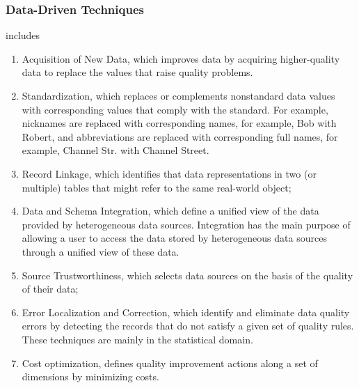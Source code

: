 \documentclass[pdftex,english,oribibl]{llncs}
\begin{document}
\subsubsection{Data-Driven Techniques}
includes
\begin{enumerate}
    \item Acquisition of New Data, which improves data by acquiring higher-quality data to replace the values that raise quality problems.
    \item Standardization, which replaces or complements nonstandard data values with corresponding values that comply with the standard. For example, nicknames are replaced with corresponding names, for example, Bob with Robert, and abbreviations are replaced with corresponding full names, for example, Channel Str. with Channel Street.
    \item Record Linkage, which identifies that data representations in two (or multiple) tables that might refer to the same real-world object;
    \item Data and Schema Integration, which define a unified view of the data provided by heterogeneous data sources. Integration has the main purpose of allowing a user to access the data stored by heterogeneous data sources through a unified view of these data.
    \item Source Trustworthiness, which selects data sources on the basis of the quality of their data;
    \item Error Localization and Correction, which identify and eliminate data quality errors by detecting the records that do not satisfy a given set of quality rules. These techniques are mainly in the statistical domain.
    \item Cost optimization, defines quality improvement actions along a set of dimensions by minimizing costs.
\end{enumerate}
\end{document}
